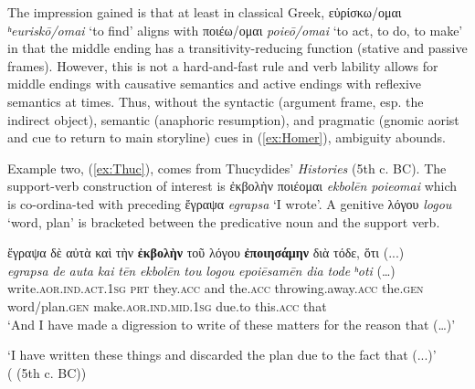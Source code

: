 \documentclass[output=paper,colorlinks,citecolor=brown]{langscibook}
\begin{document}
The impression gained is that at least in classical Greek, εὑρίσκω/ομαι \textit{ʰeuriskō/omai} ‘to find’ aligns with ποιέω/ομαι \textit{poieō/omai} ‘to act, to do, to make’ in that the middle ending has a transitivity-reducing function (stative and passive frames). However, this is not a hard-and-fast rule and verb lability allows for middle endings with causative semantics and active endings with reflexive semantics \citep{lavidasTransitivityAlternationsDiachrony2009} at times. Thus, without the syntactic (argument frame, esp. the indirect object), semantic (anaphoric resumption), and pragmatic (gnomic aorist and cue to return to main storyline) cues in (\ref{ex:Homer}), ambiguity abounds.

\largerpage[1.5]
Example two, (\ref{ex:Thuc}), comes from Thucydides’ \textit{Histories} (5th c. BC). The support-verb construction of interest is ἐκβολὴν ποιέομαι \textit{ekbolēn poieomai} which is co-ordina-ted with preceding ἔγραψα \textit{egrapsa} ‘I wrote’. A genitive λόγου \textit{logou} ‘word, plan' is bracketed between the predicative noun and the support verb. 


\ea\label{ex:Thuc}
\glll ἔγραψα δὲ αὐτὰ καὶ τὴν \textbf{ἐκβολὴν} τοῦ λόγου \textbf{ἐποιησάμην} διὰ τόδε, ὅτι (...) \\
\textit{egrapsa} \textit{de} \textit{auta} \textit{kai} \textit{tēn} \textit{ekbolēn} \textit{tou} \textit{logou} \textit{epoiēsamēn} \textit{dia} \textit{tode} \textit{ʰoti} (…) \\
    write.\textsc{aor.ind.act.1sg} \textsc{prt} they.\textsc{acc} and the.\textsc{acc} throwing.away.\textsc{acc} the.\textsc{gen} word/plan.\textsc{gen} make.\textsc{aor.ind.mid.1sg} due.to this.\textsc{acc} that \\

\glt ‘And I have made a digression to write of these matters for the reason that (…)’ \citep[165]{ForsterSmith1928}


‘I have written these things and discarded the plan due to the fact that (...)’ \citep{rustenTenEkvolenTou2020} \\

\hspace*{\fill}( (5th c. BC))
\z
\end{document}
